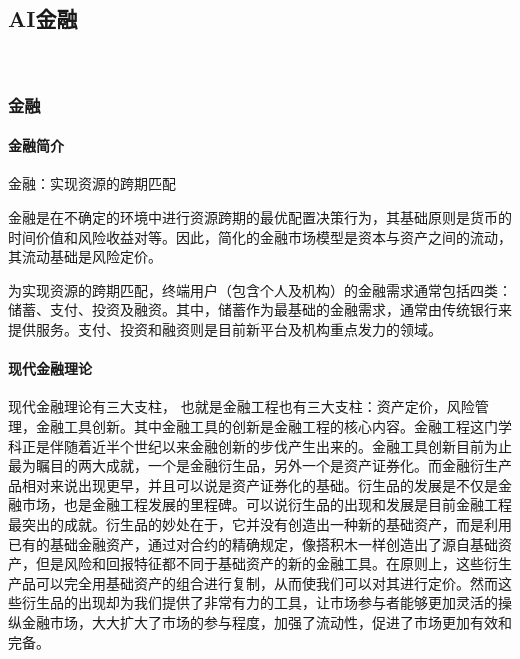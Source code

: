 \documentclass[letterpaper,10pt,english]{sphinxmanual}
\begin{document}
\subsection{AI金融}
\label{\detokenize{chapter_AI+Finance/index:ai}}\label{\detokenize{chapter_AI+Finance/index:chap-dive}}\label{\detokenize{chapter_AI+Finance/index::doc}}
​ \begin{center}\end{center} 


\subsubsection{金融}
\label{\detokenize{chapter_AI+Finance/Finance:id1}}\label{\detokenize{chapter_AI+Finance/Finance::doc}}

\paragraph{金融简介}
\label{\detokenize{chapter_AI+Finance/Finance:id2}}
金融：实现资源的跨期匹配
%
\begin{footnote}[1087]\sphinxAtStartFootnote
{}
%
\end{footnote}

金融是在不确定的环境中进行资源跨期的最优配置决策行为，其基础原则是货币的时间价值和风险收益对等。因此，简化的金融市场模型是资本与资产之间的流动，其流动基础是风险定价。

为实现资源的跨期匹配，终端用户（包含个人及机构）的金融需求通常包括四类：储蓄、支付、投资及融资。其中，储蓄作为最基础的金融需求，通常由传统银行来提供服务。支付、投资和融资则是目前新平台及机构重点发力的领域。


\paragraph{现代金融理论}
\label{\detokenize{chapter_AI+Finance/Finance:id3}}
现代金融理论有三大支柱，
也就是金融工程也有三大支柱：资产定价，风险管理，金融工具创新。其中金融工具的创新是金融工程的核心内容。金融工程这门学科正是伴随着近半个世纪以来金融创新的步伐产生出来的。金融工具创新目前为止最为瞩目的两大成就，一个是金融衍生品，另外一个是资产证券化。而金融衍生产品相对来说出现更早，并且可以说是资产证券化的基础。衍生品的发展是不仅是金融市场，也是金融工程发展的里程碑。可以说衍生品的出现和发展是目前金融工程最突出的成就。衍生品的妙处在于，它并没有创造出一种新的基础资产，而是利用已有的基础金融资产，通过对合约的精确规定，像搭积木一样创造出了源自基础资产，但是风险和回报特征都不同于基础资产的新的金融工具。在原则上，这些衍生产品可以完全用基础资产的组合进行复制，从而使我们可以对其进行定价。然而这些衍生品的出现却为我们提供了非常有力的工具，让市场参与者能够更加灵活的操纵金融市场，大大扩大了市场的参与程度，加强了流动性，促进了市场更加有效和完备。%
\begin{footnote}[1088]\sphinxAtStartFootnote
{}
%
\end{footnote}
\end{document}
